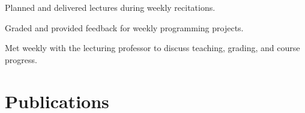 \documentclass[]{deric-pang-resume}
\begin{document}
\begin{minipage}[t]{0.66\textwidth}
\begin{tightemize}
\item Planned and delivered lectures during weekly recitations.
\item Graded and provided feedback for weekly programming projects.
\item Met weekly with the lecturing professor to discuss teaching, grading, and course progress.
\end{tightemize}
\sectionsep





\section{Publications} 
\renewcommand\refname{\vskip -1.5cm} %


\nocite{*}

\end{minipage} 
\end{document}
